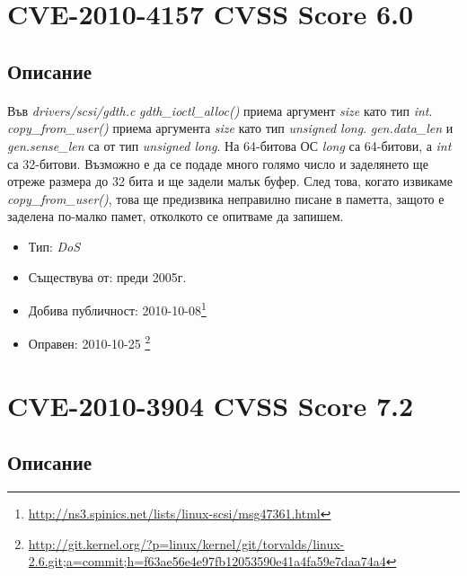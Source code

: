 \documentclass[a4paper,12pt,leqno]{article}
\begin{document}
\section{CVE-2010-4157 CVSS Score 6.0}
\subsection{Описание}
\paragraph{}
Във \textit{drivers/scsi/gdth.c}
\textit{gdth\_ioctl\_alloc()} приема аргумент \textit{size} като тип \textit{int}.
\textit{copy\_from\_user()} приема аргумента \textit{size} като тип \textit{unsigned long}.
\textit{gen.data\_len} и \textit{gen.sense\_len} са от тип \textit{unsigned long}.
На 64-битова ОС \textit{long} са 64-битови, а \textit{int} са 32-битови.
Възможно е да се подаде много голямо число и заделянето ще отреже размера до 32 бита
и ще задели малък буфер. След това, когато извикаме \textit{copy\_from\_user()},
това ще предизвика неправилно писане в паметта, защото е заделена по-малко памет,
отколкото се опитваме да запишем.
\begin{itemize}
    \item Тип: \textit{DoS}
    \item Съществува от: преди 2005г.
  	\item Добива публичност: 2010-10-08\footnote{\url{http://ns3.spinics.net/lists/linux-scsi/msg47361.html}}
    \item Оправен: 2010-10-25 \footnote{\url{http://git.kernel.org/?p=linux/kernel/git/torvalds/linux-2.6.git;a=commit;h=f63ae56e4e97fb12053590e41a4fa59e7daa74a4}}
\end{itemize}





\section{CVE-2010-3904 CVSS Score 7.2}
\subsection{Описание}
\end{document}
